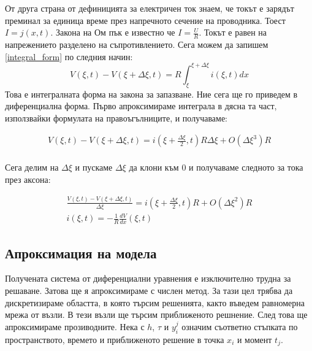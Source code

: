 \documentclass{article}
\begin{document}
    От друга страна от дефиницията за електричен ток знаем, че токът е зарядът преминал за единица време през напречното сечение на
    проводника. Тоест $I = j\left(x, t\right)$. Закона на Ом пък е известно че $I = \frac{U}{R} $. Токът е равен на напрежението разделено
    на съпротивлението. Сега можем да запишем \eqref{integral_form} по следния начин:
    \begin{equation}
        V\left(\xi,t\right) - V\left(\xi + \Delta\xi, t\right) = R\int_{\xi}^{\xi + \Delta\xi} i\left(\xi,t\right)dx
    \end{equation}
    Това е интегралната форма на закона за запазване. Ние сега ще го приведем в диференциална форма. Първо апроксимираме интеграла в дясна
    та част, използвайки формулата на правоъгълниците, и получаваме:
    
    \begin{gather*} 
        V\left(\xi,t\right) - V\left(\xi + \Delta\xi, t\right) = i\left(\xi + \frac{\Delta\xi}{2},t\right)R\Delta\xi +
        O\left(\Delta\xi^3\right)R\\
     \end{gather*}

     Сега делим на $\Delta\xi$ и пускаме $\Delta\xi$ да клони към 0 и получаваме следното за тока през аксона:
     
    \begin{gather*} 
        \frac{V\left(\xi,t\right) - V\left(\xi + \Delta\xi, t\right)}{\Delta\xi} = i\left(\xi + \frac{\Delta\xi}{2},t\right)R +
        O\left(\Delta\xi^2\right)R\\
        i\left(\xi,t\right) = -\frac{1}{R}\frac{dV}{dx}\left(\xi,t\right)
     \end{gather*}





    \subsection{Апроксимация на модела} 
    Получената система от диференциални уравнения е изключително трудна за решаване. Затова ще я апроксимираме с числен метод. За тази цел
    трябва да дискретизираме областта, в която търсим решенията, както въведем равномерна мрежа от възли. В тези възли ще търсим приближеното решнение.
    След това ще апроксимираме прозиводните. Нека с $h$, $\tau$ и $y_i^j$ означим съответно стъпката по пространството, времето и
    приближеното решение в точка $x_i$ и момент $t_j$. 
    
\end{document}
